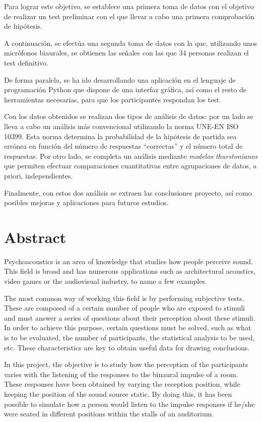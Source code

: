 \documentclass[11pt,a4paper]{book}
\begin{document}
    Para lograr este objetivo, se establece una primera toma de datos con el objetivo de realizar un test preliminar con el que llevar a cabo una primera comprobación de hipótesis. 

    A continuación, se efectúa una segunda toma de datos con la que, utilizando unos micrófonos biaurales, se obtienen las señales con las que 34 personas realizan el test definitivo.

    De forma paralela, se ha ido desarrollando una aplicación en el lenguaje de programación Python que dispone de una interfaz gráfica, así como el resto de herramientas necesarias, para que los participantes respondan los test.

    Con los datos obtenidos se realizan dos tipos de análisis de datos: por un lado se lleva a cabo un análisis más convencional utilizando la norma UNE-EN ISO 10399. Esta norma determina la probabilidad de la hipótesis de partida sea errónea en función del número de respuestas ``correctas'' y el número total de respuestas. Por otro lado, se completa un análisis mediante \textit{modelos thurstonianos} que permiten efectuar comparaciones cuantitativas entre agrupaciones de datos, a priori, independientes.

    Finalmente, con estos dos análisis se extraen las conclusiones proyecto, así como posibles mejoras y aplicaciones para futuros estudios.
    
    \chapter*{Abstract}
    Psychoacoustics is an area of knowledge that studies how people perceive sound. This field is broad and has numerous applications such as architectural acoustics, video games or the audiovisual industry, to name a few examples.

    The most common way of working this field is by performing subjective tests. These are composed of a certain number of people who are exposed to stimuli and must answer a series of questions about their perception about these stimuli. In order to achieve this purpose, certain questions must be solved, such as what is to be evaluated, the number of participants, the statistical analysis to be used, etc. These characteristics are key to obtain useful data for drawing conclusions.

    In this project, the objective is to study how the perception of the participants varies with the listening of the responses to the binaural impulse of a room. These responses have been obtained by varying the reception position, while keeping the position of the sound source static. By doing this, it has been possible to simulate how a person would listen to the impulse responses if he/she were seated in different positions within the stalls of an auditorium.
\end{document}

